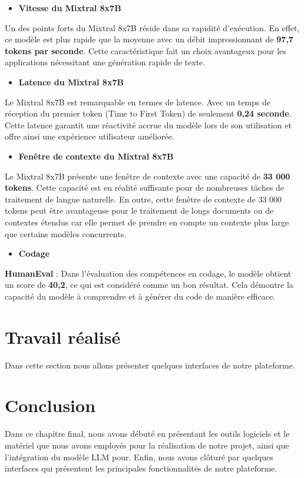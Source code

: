 \begin{itemize}
    \item \textbf{Vitesse du Mixtral 8x7B}
\end{itemize}
\noindent Un des points forts du Mixtral 8x7B réside dans sa rapidité d'exécution. En effet, ce modèle est plus rapide que la moyenne avec un débit impressionnant de \textbf{97,7 tokens par seconde}. Cette caractéristique fait un choix avantageux pour les applications nécessitant une génération rapide de texte.

\begin{itemize}
    \item \textbf{Latence du Mixtral 8x7B }
\end{itemize}
\noindent Le Mixtral 8x7B est remarquable en termes de latence. Avec un temps de réception du premier token (Time to First Token) de seulement \textbf{0,24 seconde}. Cette latence garantit une réactivité accrue du modèle lors de son utilisation et offre ainsi une expérience utilisateur améliorée.

\begin{itemize}
    \item \textbf{Fenêtre de contexte du Mixtral 8x7B }
\end{itemize}
\noindent Le Mixtral 8x7B présente une fenêtre de contexte avec une capacité de \textbf{33 000 tokens}. Cette capacité est en réalité suffisante pour de nombreuses tâches de traitement de langue naturelle. En outre, cette fenêtre de contexte de 33 000 tokens peut être avantageuse pour le traitement de longs documents ou de contextes étendus car elle permet de prendre en compte un contexte plus large que certains modèles concurrents.

\begin{itemize}
    \item \textbf{Codage }
\end{itemize}
\noindent \textbf{HumanEval} : Dans l'évaluation des compétences en codage, le modèle obtient un score de \textbf{40,2}, ce qui est considéré comme un bon résultat. Cela démontre la capacité du modèle à comprendre et à générer du code de manière efficace. \cite{codage}

\section{Travail réalisé }
Dans cette section nous allons présenter quelques interfaces de notre plateforme.

\section*{Conclusion}
Dans ce chapitre final, nous avons débuté en présentant les outils logiciels et le matériel que nous avons employés pour la réalisation de notre projet, ainsi que l'intégration du modèle LLM pour. Enfin, nous avons clôturé par quelques interfaces qui présentent les principales fonctionnalités de notre plateforme.
